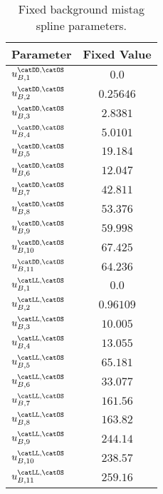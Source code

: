 \begin{table}[h]
\caption{Fixed background \OS mistag spline parameters.}
\label{tab:app:measurement_of_sin2beta:cpv_measurement:fixed_parameters:eta:bkg:os}
\centering
\begin{tabular}{lr@{$\,\pm\,$}l}
  \toprule
  Parameter                           & \multicolumn{2}{c}{Fixed Value} \\
  \midrule
    $u_{B,1}^\text{\catDD,\catOS}$    & \multicolumn{2}{c}{$0.0$}\\
    $u_{B,2}^\text{\catDD,\catOS}$    & \multicolumn{2}{c}{$0.25646$}\\
    $u_{B,3}^\text{\catDD,\catOS}$    & \multicolumn{2}{c}{$2.8381$}\\
    $u_{B,4}^\text{\catDD,\catOS}$    & \multicolumn{2}{c}{$5.0101$}\\
    $u_{B,5}^\text{\catDD,\catOS}$    & \multicolumn{2}{c}{$19.184$}\\
    $u_{B,6}^\text{\catDD,\catOS}$    & \multicolumn{2}{c}{$12.047$}\\
    $u_{B,7}^\text{\catDD,\catOS}$    & \multicolumn{2}{c}{$42.811$}\\
    $u_{B,8}^\text{\catDD,\catOS}$    & \multicolumn{2}{c}{$53.376$}\\
    $u_{B,9}^\text{\catDD,\catOS}$    & \multicolumn{2}{c}{$59.998$}\\
    $u_{B,10}^\text{\catDD,\catOS}$   & \multicolumn{2}{c}{$67.425$}\\
    $u_{B,11}^\text{\catDD,\catOS}$   & \multicolumn{2}{c}{$64.236$}\\
    $u_{B,1}^\text{\catLL,\catOS}$    & \multicolumn{2}{c}{$0.0$}\\    
    $u_{B,2}^\text{\catLL,\catOS}$    & \multicolumn{2}{c}{$0.96109$}\\    
    $u_{B,3}^\text{\catLL,\catOS}$    & \multicolumn{2}{c}{$10.005$}\\    
    $u_{B,4}^\text{\catLL,\catOS}$    & \multicolumn{2}{c}{$13.055$}\\    
    $u_{B,5}^\text{\catLL,\catOS}$    & \multicolumn{2}{c}{$65.181$}\\    
    $u_{B,6}^\text{\catLL,\catOS}$    & \multicolumn{2}{c}{$33.077$}\\    
    $u_{B,7}^\text{\catLL,\catOS}$    & \multicolumn{2}{c}{$161.56$}\\    
    $u_{B,8}^\text{\catLL,\catOS}$    & \multicolumn{2}{c}{$163.82$}\\    
    $u_{B,9}^\text{\catLL,\catOS}$    & \multicolumn{2}{c}{$244.14$}\\    
    $u_{B,10}^\text{\catLL,\catOS}$   & \multicolumn{2}{c}{$238.57$}\\    
    $u_{B,11}^\text{\catLL,\catOS}$   & \multicolumn{2}{c}{$259.16$}\\    
  \bottomrule
\end{tabular}
\end{table}
